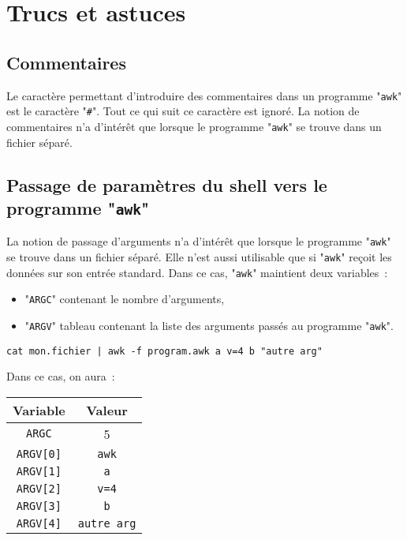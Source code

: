 \section{Trucs et astuces}

\subsection{Commentaires}

Le caract{\`e}re permettant d'introduire des commentaires dans un programme
"\texttt{awk}" est le caract{\`e}re "\verb=#=". Tout ce qui suit ce caract{\`e}re
est ignor{\'e}. La notion de commentaires n'a d'int{\'e}r{\^e}t que lorsque le
programme "\texttt{awk}" se trouve dans un fichier s{\'e}par{\'e}.

\subsection{Passage de param{\`e}tres du shell vers le programme "\texttt{awk}"}

La notion de passage d'arguments n'a d'int{\'e}r{\^e}t que lorsque le programme
"\texttt{awk}" se trouve dans un fichier s{\'e}par{\'e}. Elle n'est aussi
utilisable que si "\texttt{awk}" re\c{c}oit les donn{\'e}es sur son entr{\'e}e
standard. Dans ce cas, "\texttt{awk}" maintient deux variables~:
\begin{itemize}
	\item	{}"\texttt{ARGC}" contenant le nombre d'arguments,
	\item	{}"\texttt{ARGV}" tableau contenant la liste des arguments pass{\'e}s au
			programme "\texttt{awk}".
\end{itemize}

\begin{example}
\begin{verbatim}
cat mon.fichier | awk -f program.awk a v=4 b "autre arg"
\end{verbatim}

Dans ce cas, on aura~:\\
\begin{tabular}{|c|c|}
	\hline
		Variable	&
		Valeur		\\
	\hline \hline
		\texttt{ARGC}		&	5					\\
		\verb=ARGV[0]=	&	\texttt{awk}			\\
		\verb=ARGV[1]=	&	\texttt{a}				\\
		\verb=ARGV[2]=	&	\verb,v=4,			\\
		\verb=ARGV[3]=	&	\texttt{b}				\\
		\verb=ARGV[4]=	&	\verb*,autre arg,	\\
	\hline
\end{tabular}
\end{example}

